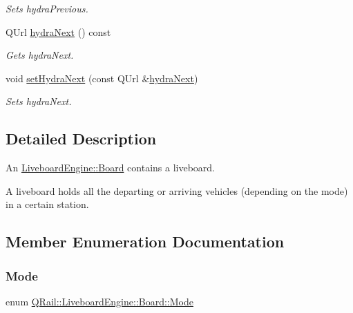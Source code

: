 \begin{DoxyCompactItemize}
\begin{DoxyCompactList}\small\item\em Sets hydra\+Previous. \end{DoxyCompactList}\item 
Q\+Url \mbox{\hyperlink{classQRail_1_1LiveboardEngine_1_1Board_a0ed5cfc1cc0b6584bf087f936f60dcab}{hydra\+Next}} () const
\begin{DoxyCompactList}\small\item\em Gets hydra\+Next. \end{DoxyCompactList}\item 
void \mbox{\hyperlink{classQRail_1_1LiveboardEngine_1_1Board_a01f417e63bf4071ffec42bab89c4a433}{set\+Hydra\+Next}} (const Q\+Url \&\mbox{\hyperlink{classQRail_1_1LiveboardEngine_1_1Board_a0ed5cfc1cc0b6584bf087f936f60dcab}{hydra\+Next}})
\begin{DoxyCompactList}\small\item\em Sets hydra\+Next. \end{DoxyCompactList}\end{DoxyCompactItemize}


\subsection{Detailed Description}
An \mbox{\hyperlink{classQRail_1_1LiveboardEngine_1_1Board}{Liveboard\+Engine\+::\+Board}} contains a liveboard. 

A liveboard holds all the departing or arriving vehicles (depending on the mode) in a certain station. 

\subsection{Member Enumeration Documentation}
\mbox{\label{classQRail_1_1LiveboardEngine_1_1Board_a0ab6d318f405895f62c6e98cb2d86c6e}} 
\subsubsection{\texorpdfstring{Mode}{Mode}}
{\footnotesize\ttfamily enum \mbox{\hyperlink{classQRail_1_1LiveboardEngine_1_1Board_a0ab6d318f405895f62c6e98cb2d86c6e}{Q\+Rail\+::\+Liveboard\+Engine\+::\+Board\+::\+Mode}}\hspace{0.3cm}{\ttfamily [strong]}}



